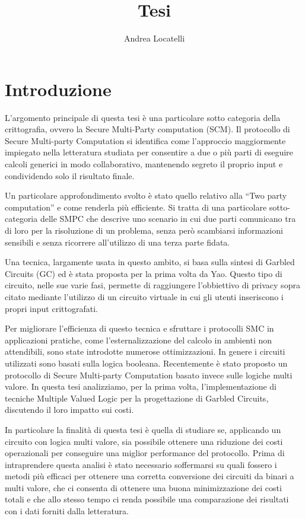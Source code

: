 \documentclass[
]{book}
\title{Tesi}
\author{Andrea Locatelli}
\date{}
\begin{document}
\maketitle

{
\setcounter{tocdepth}{1}
\tableofcontents
}
\hypertarget{introduzione}{%
\chapter*{Introduzione}\label{introduzione}}

L'argomento principale di questa tesi è una particolare sotto categoria della crittografia, ovvero la Secure Multi-Party computation (SCM). Il protocollo di Secure Multi-party Computation si identifica come l'approccio maggiormente impiegato nella letteratura studiata per consentire a due o più parti di eseguire calcoli generici in modo collaborativo, mantenendo segreto il proprio input e condividendo solo il risultato finale.

Un particolare approfondimento svolto è stato quello relativo alla ``Two party computation'' e come renderla più efficiente.
Si tratta di una particolare sotto-categoria delle SMPC che descrive uno scenario in cui due parti comunicano tra di loro per la risoluzione di un problema, senza però scambiarsi informazioni sensibili e senza ricorrere all'utilizzo di una terza parte fidata.

Una tecnica, largamente usata in questo ambito, si basa sulla sintesi di Garbled Circuits (GC) ed è stata proposta per la prima volta da Yao. Questo tipo di circuito, nelle sue varie fasi, permette di raggiungere l'obbiettivo di privacy sopra citato mediante l'utilizzo di un circuito virtuale in cui gli utenti inseriscono i propri input crittografati.

Per migliorare l'efficienza di questo tecnica e sfruttare i protocolli SMC in applicazioni pratiche, come l'esternalizzazione del calcolo in ambienti non attendibili, sono state introdotte numerose ottimizzazioni. In genere i circuiti utilizzati sono basati sulla logica booleana. Recentemente è stato proposto un protocollo di Secure Multi-party Computation basato invece sulle logiche multi valore. In questa tesi analizziamo, per la prima volta, l'implementazione di tecniche Multiple Valued Logic per la progettazione di Garbled Circuits, discutendo il loro impatto sui costi.

In particolare la finalità di questa tesi è quella di studiare se, applicando un circuito con logica multi valore, sia possibile ottenere una riduzione dei costi operazionali per conseguire una miglior performance del protocollo. Prima di intraprendere questa analisi è stato necessario soffermarsi su quali fossero i metodi più efficaci per ottenere una corretta conversione dei circuiti da binari a multi valore, che ci consenta di ottenere una buona minimizzazione dei costi totali e che allo stesso tempo ci renda possibile una comparazione dei risultati con i dati forniti dalla letteratura.
\end{document}
